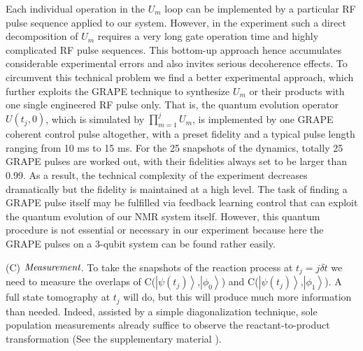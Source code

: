 \documentclass[twocolumn,showpacs,twoside,10pt,prl]{revtex4}
\begin{document}
Each individual operation in the $U_m$ loop  can be implemented by a particular RF pulse sequence applied to our system. However, in the experiment such a direct decomposition of $U_m$ requires a very long gate operation time and highly complicated RF pulse sequences. This bottom-up approach hence accumulates considerable experimental errors and
also invites serious decoherence effects. To circumvent this technical problem we find a better experimental approach, which further
exploits the GRAPE technique to synthesize $U_m$ or their products with one single engineered RF pulse only. That is, the quantum evolution operator $U(t_j, 0)$, which is simulated by $\prod_{m=1}^{j}U_m$, is implemented by one GRAPE coherent control pulse altogether, with a preset fidelity and a typical pulse length ranging from 10 ms to 15 ms.  For the 25 snapshots of the dynamics, totally 25 GRAPE pulses are worked out, with their fidelities always set to be larger than 0.99.  As a result, the technical complexity of the experiment decreases dramatically but the fidelity is maintained at a high level.  The task of finding a GRAPE pulse itself may be fulfilled via feedback learning control \cite{rabitz} that can exploit the quantum evolution of our NMR system itself.  However, this quantum procedure is not essential or necessary in our experiment because here the GRAPE pulses on a 3-qubit system can be found rather easily.

(C) $\emph{Measurement}$. To take the snapshots of the reaction process at $t_j=j\delta t$ we need to measure the overlaps of C($\left\vert \psi(t_j) \right\rangle$,$\left\vert \phi_{0} \right\rangle$) and C($\left\vert \psi({t_j}) \right\rangle$,$\left\vert \phi_{1} \right\rangle$). A full state tomography at $t_j$ will do, but this will produce much more information than needed. Indeed, assisted by a simple diagonalization technique, sole population measurements already suffice to observe the reactant-to-product transformation (See the supplementary material \cite{supplement}).

\end{document}
